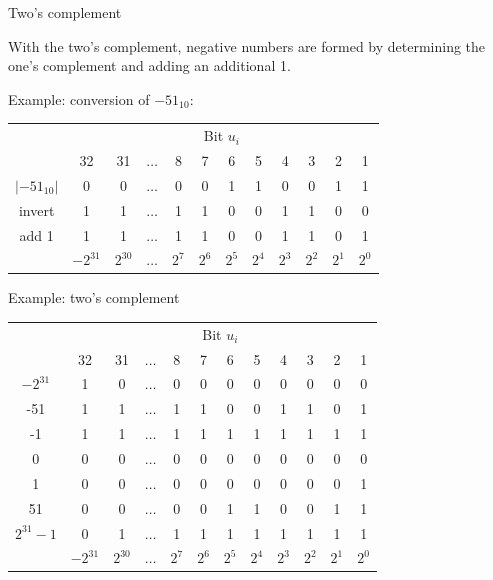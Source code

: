 \begin{vbframe}{Two's complement}

With the two's complement, negative numbers are formed by determining the one's complement and adding an additional 1.

\lz 

Example: conversion of $-51_{10}$:
\begin{footnotesize}
\begin{center}
  \begin{tabular}{ c | ccccccccccc}
      & \multicolumn{11}{c}{Bit $u_i$} \\
      & 32 & 31  & $\hdots$ & 8 & 7 & 6 & 5 & 4 & 3 & 2 & 1 \\
    \hline
    $|-51_{10}|$  & 0 & 0 & $\hdots$ & 0 & 0 & 1 & 1 & 0 & 0 & 1 & 1 \\
    invert & 1 & 1 & $\hdots$ & 1 & 1 & 0 & 0 & 1 & 1 & 0 & 0 \\
    add 1 & 1 & 1 & $\hdots$ & 1 & 1 & 0 & 0 & 1 & 1 & 0 & 1 \\
    \hline
      & $-2^{31}$ & $2^{30}$ & $\hdots$ & $2^7$ & $2^6$ & $2^5$ & $2^4$ & $2^3$ & $2^2$ & $2^1$ & $2^0$
  \end{tabular}
\end{center}
\end{footnotesize}

\framebreak


Example: two's complement
\begin{footnotesize}
\begin{center}
  \begin{tabular}{ c | ccccccccccc}
      & \multicolumn{11}{c}{Bit $u_i$} \\
      & 32 & 31  & $\hdots$ & 8 & 7 & 6 & 5 & 4 & 3 & 2 & 1 \\
    \hline
    $-2^{31}$    & 1 & 0 & $\hdots$ & 0 & 0 & 0 & 0 & 0 & 0 & 0 & 0 \\
    -51          & 1 & 1 & $\hdots$ & 1 & 1 & 0 & 0 & 1 & 1 & 0 & 1 \\
    -1           & 1 & 1 & $\hdots$ & 1 & 1 & 1 & 1 & 1 & 1 & 1 & 1 \\
    0            & 0 & 0 & $\hdots$ & 0 & 0 & 0 & 0 & 0 & 0 & 0 & 0 \\
    1            & 0 & 0 & $\hdots$ & 0 & 0 & 0 & 0 & 0 & 0 & 0 & 1 \\
    51           & 0 & 0 & $\hdots$ & 0 & 0 & 1 & 1 & 0 & 0 & 1 & 1 \\
    $2^{31}-1$   & 0 & 1 & $\hdots$ & 1 & 1 & 1 & 1 & 1 & 1 & 1 & 1 \\
    \hline
      & $-2^{31}$ & $2^{30}$ & $\hdots$ & $2^7$ & $2^6$ & $2^5$ & $2^4$ & $2^3$ & $2^2$ & $2^1$ & $2^0$
  \end{tabular}
\end{center}
\end{footnotesize}


\end{vbframe}
